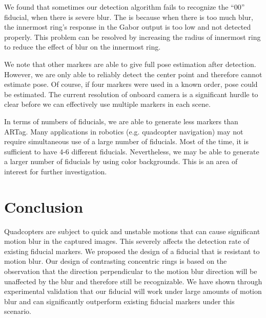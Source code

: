 \documentclass[10pt,twocolumn,letterpaper]{article}
\begin{document}
We found that sometimes our detection algorithm fails to recognize the
``00'' fiducial, when there is severe blur.  The is because when there
is too much blur, the innermost ring's response in the Gabor output is
too low and not detected properly.  This problem can be resolved by
increasing the radius of innermost ring to reduce the effect of blur
on the innermost ring.

We note that other markers are able to give full pose estimation after
detection.  However, we are only able to reliably detect the center
point and therefore cannot estimate pose.  Of course, if four markers
were used in a known order, pose could be estimated. The current
resolution of onboard camera is a significant  hurdle to clear before we
can effectively use multiple markers in each scene.

In terms of numbers of fiducials, we are able to generate less markers
than ARTag. Many applications in robotics (e.g. quadcopter navigation)
may not require simultaneous use of a large number of fiducials.  Most
of the time, it is sufficient to have 4-6 different
fiducials. Nevertheless, we may be able to generate a larger number of
fiducials by using color backgrounds. This is an area of interest for
further investigation.

\section{Conclusion}

Quadcopters are subject to quick and unstable motions that can cause
significant motion blur in the captured images. This severely affects
the detection rate of existing fiducial markers. We proposed the
design of a fiducial that is resistant to motion blur. Our design of
contrasting concentric rings is based on the observation that the
direction perpendicular to the motion blur direction will be
unaffected by the blur and therefore still be recognizable. We have
shown through experimental validation that our fiducial will work
under large amounts of motion blur and can significantly outperform
existing fiducial markers under this scenario.

{\small


}
\end{document}
